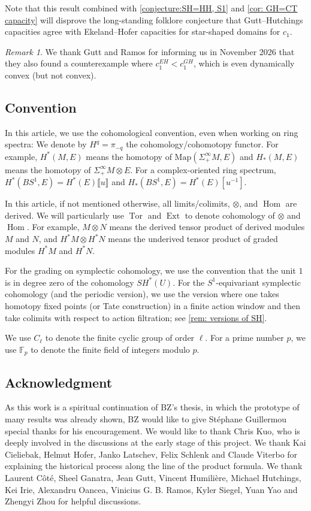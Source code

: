 \documentclass[11pt]{amsart}
\numberwithin{equation}{section}
\theoremstyle{plain}
\theoremstyle{definition}
\theoremstyle{remark}
\newtheorem{RMK}[rmk]{Remark}
\newcommand{\bF} { {\mathbb{F}}}
\newcommand{\fpw}[1]{{\llbracket #1\rrbracket}}
\newcommand\Hom{\operatorname{Hom}}
\newcommand\Ext{\operatorname{Ext}}
\newcommand\Tor{\operatorname{Tor}}
\begin{document}
Note that this result combined with \autoref{conjecture:SH=HH, S1} and \autoref{cor: GH=CT capacity} will disprove the long-standing folklore conjecture that Gutt--Hutchings capacities agree with Ekeland--Hofer capacities for star-shaped domains for $c_1$.
\begin{RMK}We thank Gutt and Ramos for informing us in November 2026 that they also found a counterexample where $c_1^{EH} < c_1^{GH}$, which is even dynamically convex (but not convex). 
\end{RMK}

\subsection{Convention}
In this article, we use the cohomological convention, even when working on ring spectra: We denote by $H^q=\pi_{-q}$ the cohomology/cohomotopy functor. For example, $H^*(M, E)$ means the homotopy of $\mathrm{Map}(\Sigma_+^\infty M, E)$ and $H_*(M, E)$ means the homotopy of $\Sigma_+^\infty M \otimes E$. For a complex-oriented ring spectrum, $H^*(BS^1, E) = H^*(E)\fpw{u}$ and $H_*(BS^1, E) = H^*(E)[u^{-1}]$.

In this article, if not mentioned otherwise, all limits/colimits, $\otimes$, and $\Hom$ are derived. We will particularly use $\Tor$ and $\Ext$ to denote cohomology of $\otimes$ and $\Hom$. For example, $M \otimes N$ means the derived tensor product of derived modules $M$ and $N$, and $H^*M \otimes H^*N$ means the underived tensor product of graded modules $H^*M$ and $H^*N$.

For the grading on symplectic cohomology, we use the convention that the unit $1$ is in degree zero of the cohomology $SH^*(U)$. For the $S^1$-equivariant symplectic cohomology (and the periodic version), we use the version where one takes homotopy fixed points (or Tate construction) in a finite action window and then take colimits with respect to action filtration; see \autoref{rem: versions of SH}.

We use $C_\ell$ to denote the finite cyclic group of order $\ell$. For a prime number $p$, we use $\bF_p$ to denote the finite field of integers modulo $p$.


\subsection*{Acknowledgment}As this work is a spiritual continuation of BZ's thesis, in which the prototype of many results was already shown, BZ would like to give Stéphane Guillermou special thanks for his encouragement. We would like to thank Chris Kuo, who is deeply involved in the discussions at the early stage of this project. We thank Kai Cieliebak, Helmut Hofer, Janko Latschev, Felix Schlenk and Claude Viterbo for explaining the historical process along the line of the product formula. We thank Laurent C\^ot\'e, Sheel Ganatra, Jean Gutt, Vincent Humilière, Michael Hutchings, Kei Irie, Alexandru Oancea, Vinicius G. B. Ramos, Kyler Siegel, Yuan Yao and Zhengyi Zhou for helpful discussions. 
\end{document}
